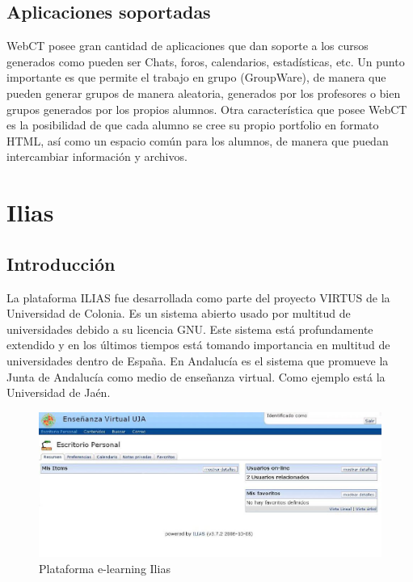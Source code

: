 \subsection{Aplicaciones soportadas}

WebCT posee gran cantidad de aplicaciones que dan soporte a los cursos generados como pueden ser Chats, foros, calendarios, estadísticas, etc. Un punto importante es que permite el trabajo en grupo (GroupWare), de manera que pueden generar grupos de manera aleatoria, generados por los profesores o bien grupos generados por los propios alumnos. Otra característica que posee WebCT es la posibilidad de que cada alumno se cree su propio portfolio en formato HTML, así como un espacio común para los alumnos, de manera que puedan intercambiar información y archivos.

\section{Ilias}

\subsection{Introducción}

La plataforma ILIAS \cite{ilias} fue desarrollada como parte del proyecto VIRTUS de la Universidad de Colonia. Es un sistema abierto usado por multitud de universidades debido a su licencia GNU. Este sistema está profundamente extendido y en los últimos tiempos está tomando importancia en multitud de universidades dentro de España. En Andalucía es el sistema que promueve la Junta de Andalucía como medio de enseñanza virtual. Como ejemplo está la Universidad de Jaén.

\begin{figure}[h]
	\includegraphics[width=\textwidth]{./img/c2-ilias.eps}
	\caption{Plataforma e-learning Ilias}
\end{figure}

